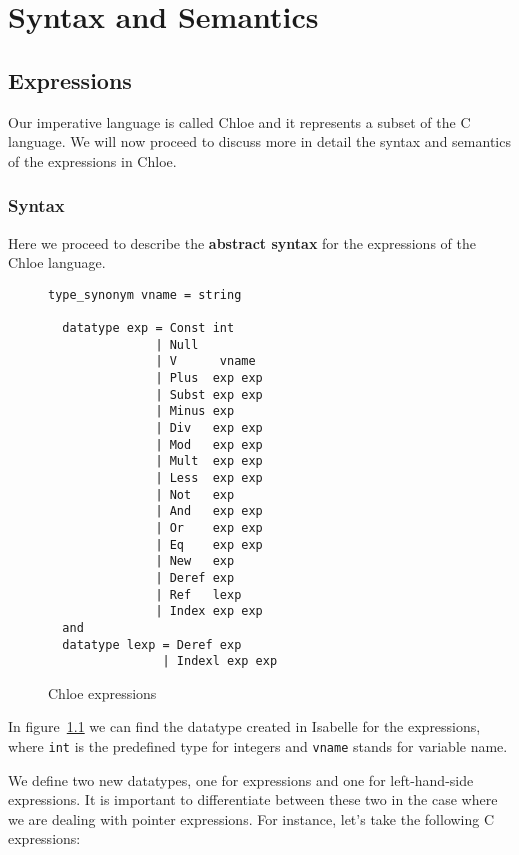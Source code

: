 \chapter{Syntax and Semantics}\label{chapter:semantics}

\section{Expressions}\label{section:expressions}

Our imperative language is called Chloe and it represents a subset of the C language.
We will now proceed to discuss more in detail the syntax and semantics of the expressions in Chloe.

\subsection{Syntax}\label{subsection:syntax_expressions}

Here we proceed to describe the \textbf{abstract syntax} for the expressions of the Chloe language.

\begin{figure}
  \begin{lstlisting}[frame=single]
  type_synonym vname = string

  datatype exp = Const int
               | Null
               | V      vname
               | Plus  exp exp
               | Subst exp exp
               | Minus exp
               | Div   exp exp
               | Mod   exp exp
               | Mult  exp exp
               | Less  exp exp
               | Not   exp
               | And   exp exp
               | Or    exp exp
               | Eq    exp exp
               | New   exp
               | Deref exp
               | Ref   lexp
               | Index exp exp
  and
  datatype lexp = Deref exp
                | Indexl exp exp
  \end{lstlisting}

  \caption{Chloe expressions}
  \label{fig:chloe_expressions}
\end{figure}

In figure~\ref{fig:chloe_expressions} we can find the datatype created in Isabelle for the expressions, where \verb|int| is the predefined type for integers and \verb|vname| stands for variable name.

We define two new datatypes, one for expressions and one for left-hand-side expressions.
It is important to differentiate between these two in the case where we are dealing with pointer expressions.
For instance, let's take the following C expressions:

